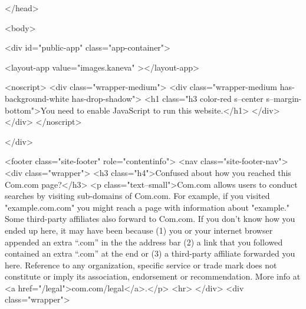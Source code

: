 </head>

<body>

<div id="public-app" class="app-container">

        
        <layout-app
        value="images.kaneva"
    ></layout-app>


        <noscript>
            <div class="wrapper-medium">
                <div class="wrapper-medium has-background-white has-drop-shadow">
                    <h1 class="h3 color-red s--center s--margin-bottom">You need to enable JavaScript to run this website.</h1>
                </div>
            </div>
        </noscript>

    </div>

    
        <footer class="site-footer" role="contentinfo">
    <nav class="site-footer-nav">
                    <div class="wrapper">
                <h3 class="h4">Confused about how you reached this Com.com page?</h3>
                <p class="text--small">Com.com allows users to conduct searches by visiting sub-domains of Com.com. For example, if you visited "example.com.com" you might reach a page with information about "example." Some third-party affiliates also forward to Com.com. If you don't know how you ended up here, it may have been because (1) you or your internet browser appended an extra “.com” in the the address bar (2) a link that you followed contained an extra “.com” at the end or (3) a third-party affiliate forwarded you here. Reference to any organization, specific service or trade mark does not constitute or imply its association, endorsement or recommendation. More info at <a href="/legal">com.com/legal</a>.</p>
                <hr>
            </div>
                <div class="wrapper">

